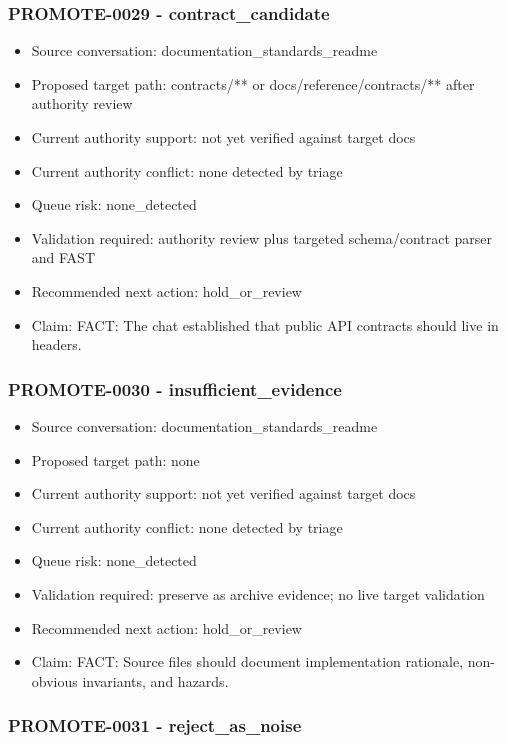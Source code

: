 \documentclass[11pt,a4paper]{report}
\begin{document}
\subsubsection{PROMOTE-0029 - contract\_candidate}

\begin{itemize}
\item Source conversation: documentation\_standards\_readme
\item Proposed target path: contracts/** or docs/reference/contracts/** after authority review
\item Current authority support: not yet verified against target docs
\item Current authority conflict: none detected by triage
\item Queue risk: none\_detected
\item Validation required: authority review plus targeted schema/contract parser and FAST
\item Recommended next action: hold\_or\_review
\item Claim: FACT: The chat established that public API contracts should live in headers.
\end{itemize}

\subsubsection{PROMOTE-0030 - insufficient\_evidence}

\begin{itemize}
\item Source conversation: documentation\_standards\_readme
\item Proposed target path: none
\item Current authority support: not yet verified against target docs
\item Current authority conflict: none detected by triage
\item Queue risk: none\_detected
\item Validation required: preserve as archive evidence; no live target validation
\item Recommended next action: hold\_or\_review
\item Claim: FACT: Source files should document implementation rationale, non-obvious invariants, and hazards.
\end{itemize}

\subsubsection{PROMOTE-0031 - reject\_as\_noise}
\end{document}
